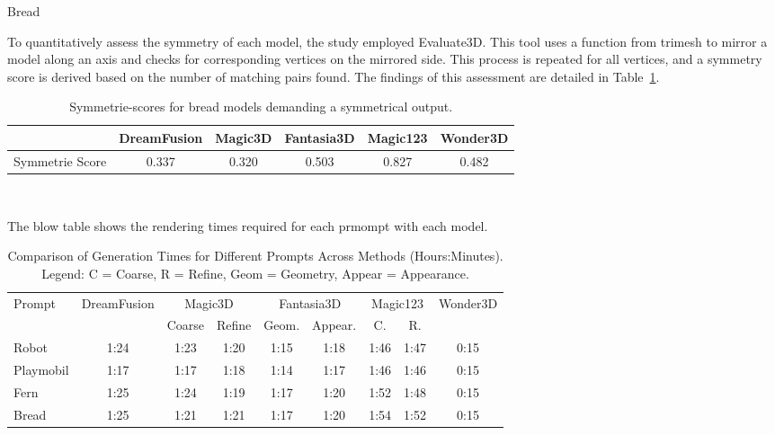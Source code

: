 Bread

To quantitatively assess the symmetry of each model, the study employed Evaluate3D. This tool uses a function from trimesh to mirror a model along an axis and checks for corresponding vertices on the mirrored side. This process is repeated for all vertices, and a symmetry score is derived based on the number of matching pairs found. The findings of this assessment are detailed in Table~\ref{table:symmetrieBread}.

\begin{table}[ht]
    \centering
    \small
    \begin{tabular}{lccccc}
    \toprule
    {} & DreamFusion & Magic3D & Fantasia3D & Magic123 & Wonder3D \\
    \midrule
    Symmetrie Score & 0.337 & 0.320 & 0.503 & 0.827 & 0.482 \\
    \bottomrule
    \end{tabular}
    \caption{Symmetrie-scores for bread models demanding a symmetrical output.}~\label{table:symmetrieBread}
\end{table}



The blow table shows the rendering times required for each prmompt with each model. 

\begin{table}[ht]
    \centering
    \small 
    \begin{tabular}{lcccccccc}
    \toprule
    Prompt & DreamFusion & \multicolumn{2}{c}{Magic3D} & \multicolumn{2}{c}{Fantasia3D} & \multicolumn{2}{c}{Magic123} & Wonder3D \\
    \cmidrule(r){3-4} \cmidrule(lr){5-6} \cmidrule(l){7-8}
    & & \multicolumn{1}{c}{Coarse} & \multicolumn{1}{c}{Refine} & \multicolumn{1}{c}{Geom.} & \multicolumn{1}{c}{Appear.} & \multicolumn{1}{c}{C.} & \multicolumn{1}{c}{R.} &  \\
    \midrule
    Robot & 1:24 & 1:23 & 1:20 & 1:15 & 1:18 & 1:46 & 1:47 & 0:15 \\
    Playmobil & 1:17 & 1:17 & 1:18 & 1:14 & 1:17 & 1:46 & 1:46 & 0:15 \\
    Fern & 1:25 & 1:24 & 1:19 & 1:17 & 1:20 & 1:52 & 1:48 & 0:15 \\
    Bread & 1:25 & 1:21 & 1:21 & 1:17 & 1:20 & 1:54 & 1:52 & 0:15 \\
    \bottomrule
    \end{tabular}
    \caption{Comparison of Generation Times for Different Prompts Across Methods (Hours:Minutes). Legend: C = Coarse, R = Refine, Geom = Geometry, Appear = Appearance.}~\label{table:generation_times_complex}
\end{table}
